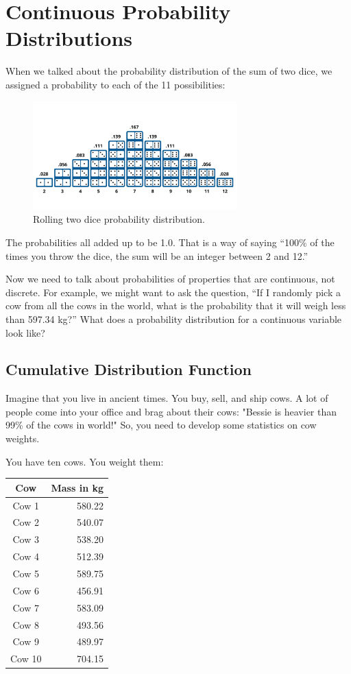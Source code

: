 \chapter{Continuous Probability Distributions}

When we talked about the probability distribution of the sum of two dice,  we assigned a probability to each of the 11 possibilities:
\begin{figure}[htbp]
    \centering
    \includegraphics[width=0.7\textwidth]{dice_histogram.png}
    \caption{Rolling two dice probability distribution.}
    \label{fig:example}
\end{figure}

The probabilities all added up to be 1.0. That is a way of saying ``100\% of the times you throw the dice,  the sum will be an integer between 2 and 12.''

Now we need to talk about probabilities of properties that are continuous,  not discrete. For example, we might want to ask the question, ``If I randomly pick a cow from all the cows in the 
world, what is the probability that it will weigh less than 597.34 kg?''  What does a probability distribution for a continuous variable look like?

\section{Cumulative Distribution Function}

Imagine that you live in ancient times. You buy, sell, and ship cows. A lot of people come into your office and brag about their cows: "Bessie is heavier than 99\% of the cows in 
world!"  So, you need to develop some statistics on cow weights.

You have ten cows. You weight them:

\begin{tabular}{c|r}
Cow & Mass in kg \\
\hline
Cow 1 & 580.22 \\
Cow 2 & 540.07 \\
Cow 3 & 538.20 \\
Cow 4 & 512.39 \\
Cow 5 & 589.75 \\
Cow 6 & 456.91 \\
Cow 7 & 583.09 \\
Cow 8 & 493.56 \\
Cow 9 & 489.97 \\
Cow 10 & 704.15 \\
\end{tabular}

